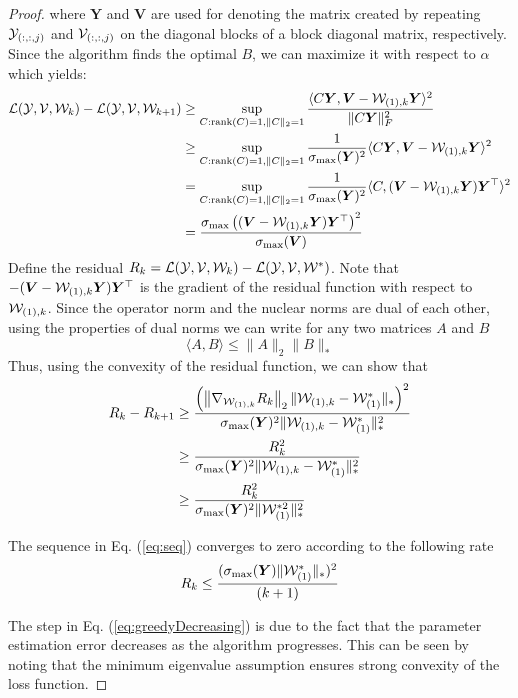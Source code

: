 \begin{proof}
\noindent where $\bm{Y}$ and $\bm{V}$ are used for denoting the matrix created by repeating ${\mathcal Y}_{(:, :, j)}$ and ${\mathcal V}_{(:, :, j)}$ on the diagonal blocks of a block diagonal matrix, respectively. Since the algorithm finds the optimal $B$, we can maximize it with respect to $\alpha$ which yields:
\begin{align*}
\mathcal{L}({\mathcal Y}, {\mathcal V}, {\mathcal W}_{k}) - \mathcal{L}({\mathcal Y}, {\mathcal V}, {\mathcal W}_{k+1}) &\geq \sup_{C: \mathrm{rank}(C) = 1, \|C\|_2 = 1} \frac{\langle C\bm{Y}, \bm{V} - {\mathcal W}_{(1), k}\bm{Y}\rangle^2}{\|C\bm{Y}\|_F^2}\\
&\geq\sup_{C: \mathrm{rank}(C) = 1, \|C\|_2 = 1} \frac{1}{\sigma_{\max}(\bm{Y})^2}\langle C\bm{Y}, \bm{V} - {\mathcal W}_{(1), k}\bm{Y}\rangle^2  \\
&=\sup_{C: \mathrm{rank}(C) = 1, \|C\|_2 = 1} \frac{1}{\sigma_{\max}(\bm{Y})^2}\langle C, (\bm{V} - {\mathcal W}_{(1), k}\bm{Y})\bm{Y}^{\top}\rangle^2\\
&  =\frac{\sigma_{\max}\left((\bm{V} - {\mathcal W}_{(1), k}\bm{Y})\bm{Y}^{\top} \right)^2}{\sigma_{\max}(\bm{V})}\\
\end{align*}
Define the residual $R_k = \mathcal{L}({\mathcal Y}, {\mathcal V}, {\mathcal W}_{k}) - \mathcal{L}({\mathcal Y}, {\mathcal V}, {\mathcal W}^{*})$. Note that $-(\bm{V} - {\mathcal W}_{(1), k}\bm{Y})\bm{Y}^{\top}$ is the gradient of the residual function with respect to ${\mathcal W}_{(1), k}$. Since the operator norm and the nuclear norms are dual of each other, using the properties of dual norms we can write for any two matrices $A$ and $B$
\begin{equation}
\langle A, B \rangle \leq \|A\|_2\|B\|_{*}
\end{equation}
Thus, using the convexity of the residual function, we can show that
\begin{align}
R_k - R_{k+1} &\geq \frac{\left(\left\| \nabla_{{\mathcal W}_{(1), k}}R_k\right\|_2 \|{\mathcal W}_{(1), k} - {\mathcal W}_{(1)}^{*}\|_*\right)^2}{\sigma_{\max}(\bm{Y})^2\|{\mathcal W}_{(1), k} - {\mathcal W}_{(1)}^{*}\|_*^2}\\
& \geq\frac{R_k^2}{\sigma_{\max}(\bm{Y})^2\|{\mathcal W}_{(1), k} - {\mathcal W}_{(1)}^{*}\|_*^2}\label{eq:greedyDecreasing}\\
& \geq \frac{R_k^2}{\sigma_{\max}(\bm{Y})^2\|{\mathcal W}_{(1)}^{*2}\|_*^2}\label{eq:seq}
\end{align}

The sequence in Eq. (\ref{eq:seq}) converges to zero according to the following rate \cite[Lemma B.2]{ShalevShwartz2010}%
\begin{equation*}
R_k \leq \frac{(\sigma_{\max}(\bm{Y})\|{\mathcal W}_{(1)}^*\|_{*})^2}{(k+1)}
\end{equation*}

The step in Eq. (\ref{eq:greedyDecreasing}) is due to the fact that the parameter estimation error decreases as the algorithm progresses. This can be seen by noting that the minimum eigenvalue assumption ensures strong convexity of the loss function. 
\end{proof}
